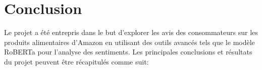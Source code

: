 


\section{Conclusion}

Le projet a été entrepris dans le but d'explorer les avis des consommateurs sur les produits alimentaires d'Amazon en utilisant des outils avancés tels que le modèle RoBERTa pour l'analyse des sentiments. Les principales conclusions et résultats du projet peuvent être récapitulés comme suit:





